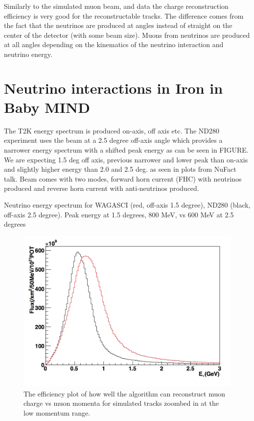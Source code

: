 Similarly to the simulated muon beam, and data the charge reconstruction efficiency is very good for the reconstructable tracks. The difference comes from the fact that the neutrinos are produced at angles instead of straight on the center of the detector (with some beam size). Muons from neutrinos are produced at all angles depending on the kinematics of the neutrino interaction and neutrino energy. 



 
\pagebreak
\newpage
\section{Neutrino interactions in Iron in Baby MIND}

The T2K energy spectrum is produced on-axis, off axis etc. The ND280 experiment uses the beam at a 2.5 degree off-axis angle which provides a narrower energy spectrum with a shifted peak energy as can be seen in FIGURE.
We are expecting 1.5 deg off axis, previous narrower and lower peak than on-axis and slightly higher energy than 2.0 and 2.5 deg. as seen in plots from NuFact talk. Beam comes with two modes, forward horn current (FHC) with neutrinos produced and reverse horn current with anti-neutrinos produced.

Neutrino energy spectrum for WAGASCI (red, off-axis 1.5 degree), ND280 (black, off-axis 2.5 degree). Peak energy at 1.5 degrees, 800 MeV, vs 600 MeV at 2.5 degrees


\begin{figure}[h!]
\centering
\includegraphics[width=.9\textwidth]{figures/NeutrinoChap/ND280vsWAGASCIspectrum.jpeg}
\caption{The efficiency plot of how well the algorithm can reconstruct muon charge vs muon momenta for simulated tracks zoombed in at the low momentum range.}
\label{fig:T2KTASDCombinedZoom}
\end{figure}



